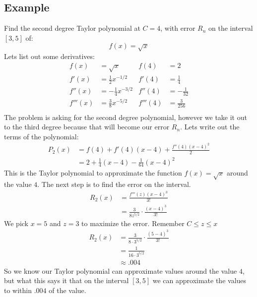 \documentclass{report}
\begin{document}
    \subsection{Example}
        Find the second degree Taylor polynomial at \(C = 4\), with error \(R_n\) on the interval \([3, 5]\) of:
        \[f(x) = \sqrt{x}\]
        Lets list out some derivatives:
        \begin{align*}
            f(x) &= \sqrt{x}
            & f(4) &= 2\\
            f'(x) &= \frac{1}{2} x^{-1/2}
            &f'(4) &= \frac{1}{4}\\
            f''(x) &= - \frac{1}{4} x^{-3/2}
            &f''(4) &= - \frac{1}{32}\\
            f'''(x) &= \frac{3}{8} x^{-5/2}
            &f'''(4) &= \frac{3}{256}\\
        \end{align*}
        The problem is asking for the second degree polynomial, however we take it out to the third degree because that will become our error \(R_n\).
        Lets write out the terms of the polynomial:
        \begin{align*}
            P_2(x) &= f(4) + f'(4)(x-4) + \frac{f''(4)(x-4)^2}{2} \\
            &= 2 + \frac{1}{4}(x-4) - \frac{1}{64}(x-4)^2
        \end{align*}
        This is the Taylor polynomial to approximate the function \(f(x) = \sqrt{x}\) around the value \(4\).
        The next step is to find the error on the interval.
        \begin{align*}
            R_2(x) &= \frac{f'''(z) (x-4)^3}{3!} \\
            &= \frac{3}{8z^{5/2}} \cdot \frac{(x-4)^3}{3!}
        \end{align*}
        We pick \(x = 5\) and \(z = 3\) to maximize the error.
        Remember \(C \leq z \leq x\)
        \begin{align*}
            R_2(x) &= \frac{3}{8 \cdot 3^{5/2}} \cdot \frac{(5-4)^3}{3!} \\
            &= \frac{1}{16 \cdot 3^{5/2}} \\
            &\approx .004
        \end{align*}
        So we know our Taylor polynomial can approximate values around the value \(4\), but what this says it that on the interval
        \([3, 5]\) we can approximate the values to within \(.004\) of the value.
\end{document}
